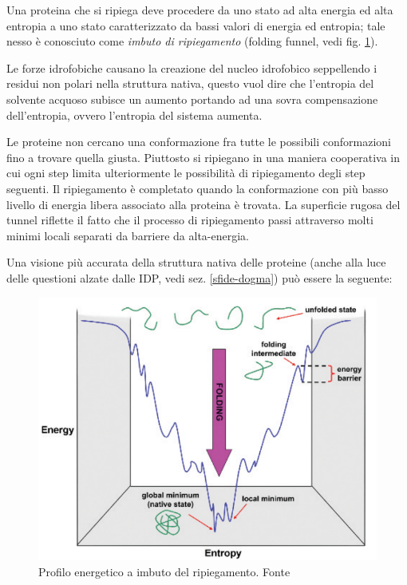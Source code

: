 {{\par Una proteina che si ripiega deve procedere da uno stato ad alta energia ed alta entropia a uno stato caratterizzato da bassi valori di energia ed entropia;
tale nesso è conosciuto come \textit{imbuto di ripiegamento} (folding funnel, vedi fig. \ref{fig:imbuto}). 

\par Le forze idrofobiche causano la creazione del nucleo idrofobico seppellendo i residui non polari nella struttura nativa, questo vuol dire che l'entropia del solvente acquoso subisce un aumento portando ad una sovra compensazione dell'entropia, ovvero l'entropia del sistema aumenta.

\par Le proteine non cercano una conformazione fra tutte le possibili conformazioni fino a trovare quella giusta. Piuttosto si ripiegano in una maniera cooperativa in cui ogni step limita ulteriormente le possibilità di ripiegamento degli step seguenti. Il ripiegamento è completato quando la conformazione con più basso livello di energia libera associato alla proteina è trovata. La superficie rugosa del tunnel riflette il fatto che il processo di ripiegamento passi attraverso molti minimi locali separati da barriere da alta-energia. \\

\par Una visione più accurata della struttura nativa delle proteine (anche alla luce delle questioni alzate dalle IDP, vedi sez. \ref{sfide-dogma}) può essere la seguente: \\

\begin{figure}[!htb]
	\centering
	\includegraphics[scale=0.6]{images/imbuto.png}
	\caption{Profilo energetico a imbuto del ripiegamento. Fonte \cite{kessel_ben-tal_2018}}
	\label{fig:imbuto}
\end{figure}

}}
